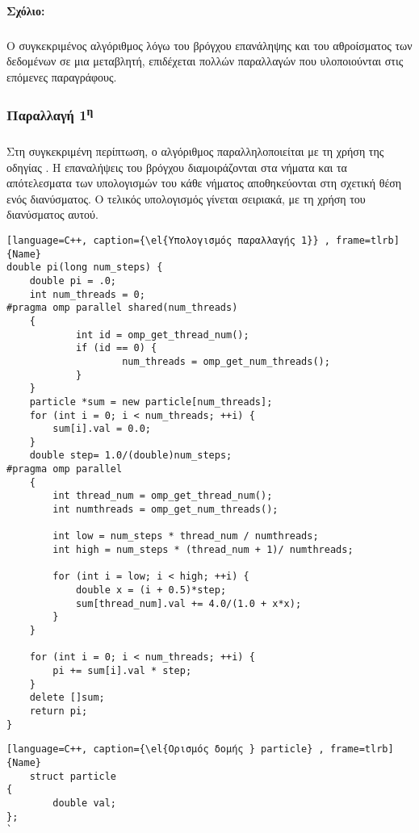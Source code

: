 \paragraph{Σχόλιο:}
\subparagraph{}
Ο συγκεκριμένος αλγόριθμος λόγω του βρόγχου επανάληψης και του αθροίσματος των δεδομένων σε μια μεταβλητή, επιδέχεται πολλών παραλλαγών που υλοποιούνται στις επόμενες παραγράφους.


\clearpage
\subsubsection{Παραλλαγή 1\textsuperscript{η}}
\subparagraph{}
Στη συγκεκριμένη περίπτωση, ο αλγόριθμος παραλληλοποιείται με τη χρήση της οδηγίας \emph{}. Η επαναλήψεις του βρόγχου διαμοιράζονται στα νήματα και τα απότελεσματα των υπολογισμών του κάθε νήματος αποθηκεύονται στη σχετική θέση ενός διανύσματος. Ο τελικός υπολογισμός γίνεται σειριακά, με τη χρήση του διανύσματος αυτού.
\begin{lstlisting}[language=C++, caption={\el{Υπολογισμός παραλλαγής 1}} , frame=tlrb]{Name}
double pi(long num_steps) {
    double pi = .0;
    int num_threads = 0;
#pragma omp parallel shared(num_threads)
    {
            int id = omp_get_thread_num();
            if (id == 0) {
                    num_threads = omp_get_num_threads();
            }
    }
    particle *sum = new particle[num_threads];
    for (int i = 0; i < num_threads; ++i) {
        sum[i].val = 0.0;
    }
    double step= 1.0/(double)num_steps;
#pragma omp parallel 
    {
        int thread_num = omp_get_thread_num();
        int numthreads = omp_get_num_threads();

        int low = num_steps * thread_num / numthreads;
        int high = num_steps * (thread_num + 1)/ numthreads;

        for (int i = low; i < high; ++i) {
            double x = (i + 0.5)*step;
            sum[thread_num].val += 4.0/(1.0 + x*x);
        }
    }

    for (int i = 0; i < num_threads; ++i) {
        pi += sum[i].val * step;
    }
    delete []sum;
    return pi;
}

\end{lstlisting}


\clearpage
{}
\begin{lstlisting}[language=C++, caption={\el{Ορισμός δομής } particle} , frame=tlrb]{Name}
	struct particle
{
        double val;
};
`

\end{lstlisting}

